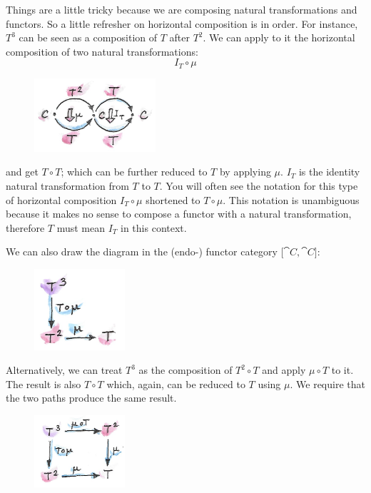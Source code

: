 Things are a little tricky because we are composing natural
transformations and functors. So a little refresher on horizontal
composition is in order. For instance, $T^3$ can be seen as a
composition of $T$ after $T^2$. We can apply to it the
horizontal composition of two natural transformations:
\[I_T \circ \mu\]

\begin{figure}[H]
  \centering
  \includegraphics[width=0.4\textwidth]{images/assoc1.png}
\end{figure}

\noindent
and get $T \circ T$; which can be further reduced to $T$ by
applying $\mu$. $I_T$ is the identity natural transformation
from $T$ to $T$. You will often see the notation for this
type of horizontal composition $I_T \circ \mu$ shortened to
$T \circ \mu$. This notation is unambiguous because it makes no sense to
compose a functor with a natural transformation, therefore $T$
must mean $I_T$ in this context.

\noindent
We can also draw the diagram in the (endo-) functor category ${[}\cat{C}, \cat{C}{]}$:

\begin{figure}[H]
  \centering
  \includegraphics[width=0.3\textwidth]{images/assoc2.png}
\end{figure}

\noindent
Alternatively, we can treat $T^3$ as the composition of
$T^2 \circ T$ and apply $\mu \circ T$ to it. The result is also
$T \circ T$ which, again, can be reduced to $T$ using $\mu$. We
require that the two paths produce the same result.

\begin{figure}[H]
  \centering
  \includegraphics[width=0.3\textwidth]{images/assoc.png}
\end{figure}

